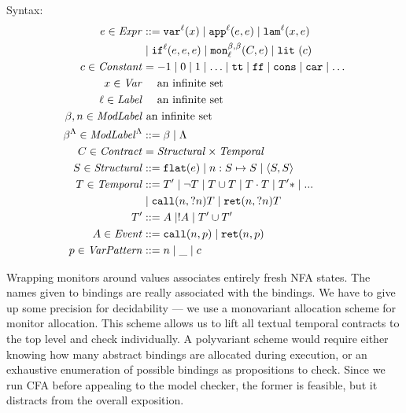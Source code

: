 \documentclass[preprint,onecolumn,9pt]{sigplanconf} %
\begin{document}
Syntax:
\begin{align*}
\mexp \in \Expr &::=
      \svar[^\mlab]{\mvar}
 \alt \sapp[^\mlab]{\mexp}{\mexp}
 \alt \slam[^\mlab]{\mvar}{\mexp} \\
&\alt \sif[^\mlab]{\mexp}{\mexp}{\mexp} 
 \alt \sMon{\mmlab}{\mmlab}{\mlab}{\mcontract, \mexp}
 \alt \slit{\mconstant} \\
\mconstant \in \Constant &= -1 \alt 0 \alt 1 \alt \ldots \alt \strue \alt \sfalse \alt \scons \alt \scar \alt \ldots \\
\mvar \in \Var &\quad\text{ an infinite set} \\
\mlab \in \Label &\quad\text{ an infinite set} \\
\mmlab,\mname \in \ModuleLabel &\text{ an infinite set} \\
\msmlab \in \ModuleLabel^{\toplevel} &::= \mmlab \alt \toplevel \\
\mcontract \in \Contract &= \SContract \times \TContract \\
\mscon \in \SContract &::= \sflat{\mexp} \alt \sarr{\mname}{\mscon}{\mscon} \alt \sconsc{\mscon}{\mscon} \\
\mtcon \in \TContract &::=
      \mtconNoB
 \alt \stnot{\mtcon}
 \alt \stOr{\mtcon}{\mtcon}
 \alt \stseq{\mtcon}{\mtcon}
 \alt \stmany{\mtconNoB}
 \alt \sddd \\
&\alt \stcall{\mname}{\mname}{\mtcon}
 \alt \stret{\mname}{\mname}{\mtcon} \\
\mtconNoB &::= \mevent \alt \snonevent{\mevent} \alt \stOr{\mtconNoB}{\mtconNoB} \\
\mevent \in \Event &::= \scallev{\mname}{\mvpat} \alt \sretev{\mname}{\mvpat} \\
\mvpat \in \VPat &::= \mname \alt \swc \alt \mconstant
\end{align*}

Wrapping monitors around values associates entirely fresh NFA states.
%
The names given to bindings are really associated with the bindings.
%
We have to give up some precision for decidability --- we use a monovariant allocation scheme for monitor allocation.
%
This scheme allows us to lift all textual temporal contracts to the top level and check individually.
%
A polyvariant scheme would require either knowing how many abstract bindings are allocated during execution, or an exhaustive enumeration of possible bindings as propositions to check.
%
Since we run CFA before appealing to the model checker, the former is feasible, but it distracts from the overall exposition.
\end{document}
